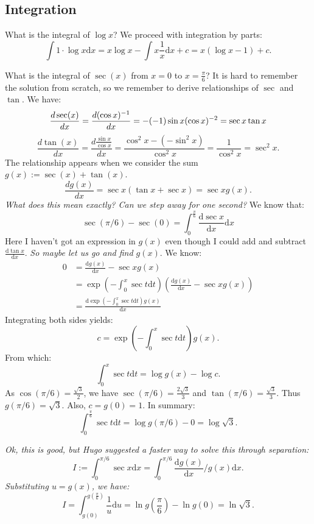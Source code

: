 \subsection{Integration}

\begin{qanda}
    \Q
    What is the integral of $\log x$?
    \A
    We proceed with integration by parts:
    \[
        \int 1 \cdot \log x \mathrm{d}x= x \log x - \int x \frac{1}{x} \mathrm{d}x + c = x(\log x - 1) + c.
    \]
\end{qanda}


\begin{qanda}
    \Q
    What is the integral of $\sec(x)$ from $x=0$ to $x=\frac{\pi}{6}$?
    \A
    It is hard to remember the solution from scratch, so we remember to derive relationships of $\sec$ and $\tan$.
    We have:
    \[
        \frac{d \sec(x)}{dx} = \frac{d (\cos x)^{-1}}{dx} = -(-1) \sin x (\cos x)^{-2} = \sec x \tan x \\
    \]
    \[
        \frac{d \tan (x)}{dx} = \frac{d \frac{\sin x}{\cos x}}{dx} = \frac{\cos^2 x - (-\sin^2 x) }{\cos^2 x} = \frac{1}{\cos^2 x} = \sec^2 x.
    \]
    The relationship appears when we consider the sum $g(x) := \sec(x) + \tan(x)$.
    \[
        \frac{d g(x)}{dx} = \sec x (\tan x + \sec x) = \sec x g(x).
    \]
    \emph{What does this mean exactly? Can we step away for one second?}
    We know that:
    \[
        \sec(\pi / 6) - \sec(0) = \int_{0}^{\frac{\pi}{6}} \frac{\mathrm{d}\sec x}{\mathrm{d}x} \mathrm{d}x
    \]
    Here I haven't got an expression in $g(x)$ even though I could add and subtract $\frac{\mathrm{d}\tan x}{\mathrm{d}x}$.
    \emph{So maybe let us go and find $g(x)$}. We know:
    \begin{align*}
        0 &= 
    \frac{\mathrm{d}g(x)}{\mathrm{d}x} - \sec x g(x) \\
          &=
\exp \left( - \int_0^x \sec t \mathrm{d}t \right) \left(  \frac{\mathrm{d}g(x)}{\mathrm{d}x} - \sec x g(x) \right)  \\
          &= \frac{\mathrm{d} \exp \left( - \int_0^x \sec t \mathrm{d}t \right) g(x)}{\mathrm{d}x} 
    \end{align*}
    Integrating both sides yields:
    \[
        c = \exp \left( - \int_0^x \sec t \mathrm{d}t \right) g(x).
    \]
    From which:
    \[
    \int_{0}^{x} \sec t \mathrm{d}t = \log g(x) - \log c.
    \]
    As $\cos(\pi / 6) = \frac{\sqrt{3}}{2}$, we have $\sec(\pi / 6) = \frac{2\sqrt{3}}{3}$ and $\tan(\pi / 6) = \frac{\sqrt{3}}{3}$.
    Thus $g( \pi / 6) = \sqrt{3}$.
    Also, $c = g(0) = 1$. In summary:
    \[
    \int_{0}^{\frac{\pi}{6}} \sec t \mathrm{d}t = \log g(\pi / 6) - 0 = \log \sqrt{3}.
    \]

    \emph{Ok, this is good, but Hugo suggested a faster way to solve this through separation:}
    \[
        I := \int_{0}^{\pi / 6} \sec x \mathrm{d}x =
        \int_{0}^{\pi / 6} \frac{\mathrm{d}g(x)}{\mathrm{d}x} / g(x)\mathrm{d}x 
        .
    \]
    \emph{Substituting $u = g(x)$, we have:}
    \[
    I = \int_{g(0)}^{g(\frac{\pi}{6})} \frac{1}{u} \mathrm{d}u = \ln g(\frac{\pi}{6}) - \ln g(0) = \ln \sqrt{3}.
    \]
\end{qanda}

